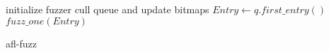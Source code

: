 


\begin{algorithm}
    initialize fuzzer\;
     {
      cull queue and update bitmaps\;
      $Entry \leftarrow q.first\_entry()$\;
      $fuzz\_one(Entry)$\;
    }
    \caption{afl-fuzz}
    \label{algo:afl}
\end{algorithm}